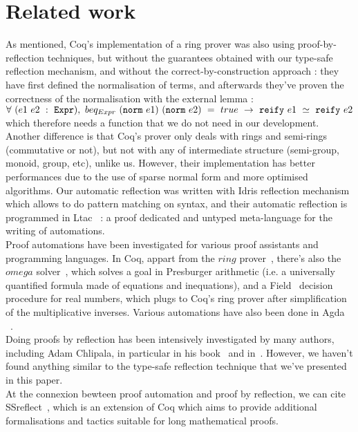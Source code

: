 \section{Related work}
\label{sect:relatedWork}

As mentioned, Coq's implementation of a ring prover was also using proof-by-reflection techniques, but without the guarantees obtained with our type-safe reflection mechanism, and without the correct-by-construction approach : they have first defined the normalisation of terms, and afterwards they've proven the correctness of the normalisation with the external lemma :
$\forall\ (e1\ e2\ :\ \code{Expr}),\ beq_{Expr}\ (\code{norm}\ e1)\ (\code{norm}\ e2)\ =\ true\ \rightarrow\ \code{reify}\ e1\ \simeq\ \code{reify}\ e2$ which therefore needs a  function that we do not need in our development. Another difference is that Coq's prover only deals with rings and semi-rings (commutative or not), but not with any of intermediate structure (semi-group, monoid, group, etc), unlike us. However, their implementation has better performances due to the use of sparse normal form and more optimised algorithms.
Our automatic reflection was written with Idris reflection mechanism which allows to do pattern matching on syntax, and their automatic reflection is programmed in Ltac~\cite{DelahayeLTac} : a proof dedicated and untyped meta-language for the writing of automations. \\

Proof automations have been investigated for various proof assistants and programming languages. In Coq, appart from the $ring$ prover~\cite{Coq2005}, there's also the $omega$ solver~\cite{Cregut04}, which solves a goal in Presburger arithmetic (i.e. a universally quantified formula made of equations and inequations), and a Field~\cite{DelahayeField} decision procedure for real numbers, which plugs to Coq's ring prover after simplification of the multiplicative inverses. Various automations have also been done in Agda~\cite{DBLP:conf/mpc/KokkeS15} ~\cite{Lindblad04}. \\

Doing proofs by reflection has been intensively investigated by many authors, including Adam Chlipala, in particular in his book~\cite{ChlipalaBook} and in~\cite{Malecha14}. However, we haven't found anything similar to the type-safe reflection technique that we've presented in this paper. \\

At the connexion bewteen proof automation and proof by reflection, we can cite SSreflect~\cite{GonthierTuto}, which is an extension of Coq which aims to provide additional formalisations and tactics suitable for long mathematical proofs. \\

